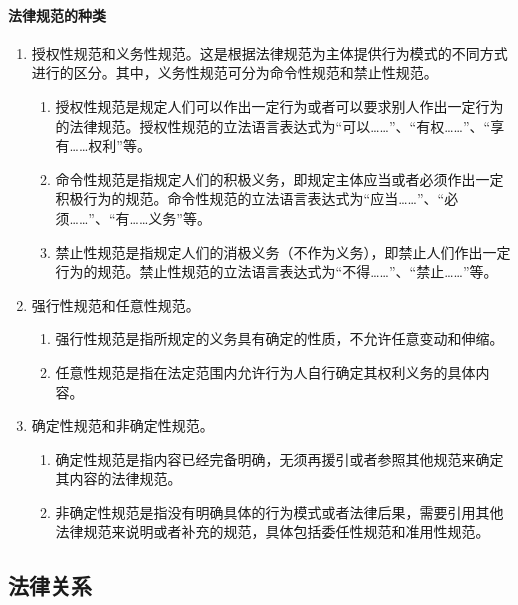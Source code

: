 \documentclass[UTF8,12pt]{ctexart}
\numberwithin{equation}{section} %
\numberwithin{figure}{section}
\numberwithin{table}{section}
\begin{document}
	\paragraph{法律规范的种类}
	\begin{enumerate}
		\item 授权性规范和义务性规范。这是根据法律规范为主体提供行为模式的不同方式进行的区分。其中，义务性规范可分为命令性规范和禁止性规范。
		\begin{enumerate}
			\item 授权性规范是规定人们可以作出一定行为或者可以要求别人作出一定行为的法律规范。授权性规范的立法语言表达式为“可以……”、“有权……”、“享有……权利”等。
			
			\item 命令性规范是指规定人们的积极义务，即规定主体应当或者必须作出一定积极行为的规范。命令性规范的立法语言表达式为“应当……”、“必须……”、“有……义务”等。
			
			\item 禁止性规范是指规定人们的消极义务（不作为义务），即禁止人们作出一定行为的规范。禁止性规范的立法语言表达式为“不得……”、“禁止……”等。
		\end{enumerate}
		
		\item 强行性规范和任意性规范。
		\begin{enumerate}
			\item 强行性规范是指所规定的义务具有确定的性质，不允许任意变动和伸缩。
			
			\item 任意性规范是指在法定范围内允许行为人自行确定其权利义务的具体内容。
		\end{enumerate}
		
		
		\item 确定性规范和非确定性规范。
		\begin{enumerate}
			\item 确定性规范是指内容已经完备明确，无须再援引或者参照其他规范来确定其内容的法律规范。
			
			\item 非确定性规范是指没有明确具体的行为模式或者法律后果，需要引用其他法律规范来说明或者补充的规范，具体包括委任性规范和准用性规范。
		\end{enumerate}
		
	\end{enumerate}
	
	
	\subsection{法律关系}
\end{document}
